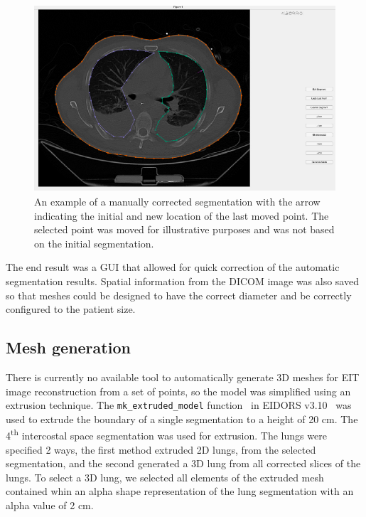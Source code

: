 \begin{figure}
	\centering
	\includegraphics[width=\textwidth]{chapter5-CT_to_mesh/imgs/SegmentationAppCorrected.pdf}
	\caption[Manually corrected segmentation]{\label{fig:seg-app-corrected}%
	An example of a manually corrected segmentation with the arrow indicating the initial
	and new location of the last moved point. The selected point was moved for illustrative
	purposes and was not based on the initial segmentation.}
\end{figure}

The end result was a GUI that allowed for quick correction of the automatic segmentation 
results. Spatial information from the DICOM image was also saved so that meshes could be
designed to have the correct diameter and be correctly configured to the patient size.

\subsection{Mesh generation} \label{sec:mesh-gen}
There is currently no available tool to automatically generate 3D meshes for 
EIT image reconstruction from a set of points, so the model was simplified using an extrusion technique. 
The \verb!mk_extruded_model! 
function~\parencite{grychtol_fem_2013}
in EIDORS v3.10~\parencite{adler_eidors_2017} was used to extrude the boundary 
of a single segmentation to a height of 20 cm.
The 4\textsuperscript{th} intercostal space segmentation was used for extrusion.
The lungs were specified 2 ways, the first method extruded 2D lungs, 
from the selected segmentation, and the second generated a 3D lung from all corrected
slices of the lungs. 
To select a 3D lung, we selected all elements of the extruded mesh contained whin an 
alpha shape representation of the lung segmentation with an alpha value of 2 cm.

